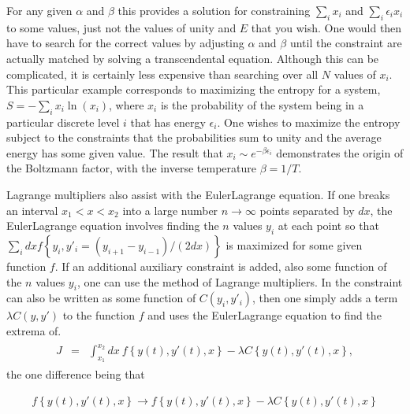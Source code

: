 \documentclass[letterpaper,10pt,english]{sphinxmanual}
\begin{document}
For any given \(\alpha\) and \(\beta\) this provides a solution for
constraining \(\sum_i x_i\) and \(\sum_i\epsilon_ix_i\) to some values,
just not the values of unity and \(E\) that you wish. One would then
have to search for the correct values by adjusting \(\alpha\) and
\(\beta\) until the constraint are actually matched by solving a
transcendental equation. Although this can be complicated, it is
certainly less expensive than searching over all \(N\) values of
\(x_i\). This particular example corresponds to maximizing the entropy
for a system, \(S=-\sum_i x_i\ln(x_i)\), where \(x_i\) is the probability
of the system being in a particular discrete level \(i\) that has energy
\(\epsilon_i\). One wishes to maximize the entropy subject to the
constraints that the probabilities sum to unity and the average energy
has some given value. The result that \(x_i\sim e^{-\beta\epsilon_i}\)
demonstrates the origin of the Boltzmann factor, with the inverse
temperature \(\beta=1/T\).

Lagrange multipliers also assist with the Euler\sphinxhyphen{}Lagrange equation. If
one breaks an interval \(x_1<x<x_2\) into a large number
\(n\rightarrow\infty\) points separated by \(dx\), the Euler\sphinxhyphen{}Lagrange
equation involves finding the \(n\) values \(y_i\) at each point so that
\(\sum_i dx f\left\{y_i,y'_i=(y_{i+1}-y_{i-1})/(2dx)\right\}\) is
maximized for some given function \(f\). If an additional auxiliary
constraint is added, also some function of the \(n\) values \(y_i\), one
can use the method of Lagrange multipliers. In the constraint can also
be written as some function of \(C(y_i,y'_i)\), then one simply adds a
term \(\lambda C(y,y')\) to the function \(f\) and uses the Euler\sphinxhyphen{}Lagrange
equation to find the extrema of.
\begin{equation*}
\begin{split}
\begin{eqnarray}
J&=&\int_{x_1}^{x_2}dx~f\left\{y(t),y'(t),x\right\}-\lambda C\left\{y(t),y'(t),x\right\},
\end{eqnarray}
\end{split}
\end{equation*}
the one difference being that




\begin{equation*}
\begin{split}
\begin{equation}
f\left\{y(t),y'(t),x\right\}\rightarrow f\left\{y(t),y'(t),x\right\}-\lambda C\left\{y(t),y'(t),x\right\}
\label{_auto95} \tag{131}
\end{equation}
\end{split}
\end{equation*}
\end{document}
